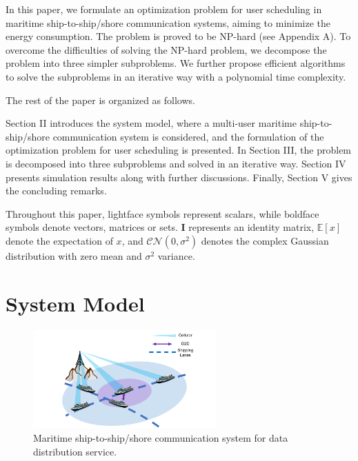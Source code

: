 \documentclass[conference]{IEEEtran}
\begin{document}

In this paper, we formulate an optimization problem for user scheduling in maritime ship-to-ship/shore communication systems, aiming to minimize the energy consumption. %
The problem is proved to be NP-hard (see Appendix A). To overcome the difficulties of solving the NP-hard problem, we decompose the problem into three simpler subproblems. We further propose efficient algorithms to solve the subproblems in an iterative way with a polynomial time complexity.



The rest of the paper is organized as follows.

Section II introduces the system model, where a multi-user maritime ship-to-ship/shore communication system is considered, and the formulation of the optimization problem for user scheduling is presented.
In Section III,  the problem is decomposed into three subproblems and solved in an iterative way.
Section IV presents simulation results along with further discussions.
Finally, Section V gives the concluding remarks.

Throughout this paper, lightface symbols represent scalars, while boldface symbols denote vectors, matrices or sets. ${\mathbf{I}}$ represents an identity matrix, $\mathbb{E}[x]$ denote the expectation of $x$, and $\mathcal{CN}(0, {\sigma}^2)$ denotes the complex Gaussian distribution with zero mean and ${\sigma}^2$ variance. 



\section{System Model}\label{sec:2}



\begin{figure} [htb]
\begin{center}
\includegraphics*[width=7cm]{SysModel.png}
\end{center}
\vspace*{-4mm} 
\caption{Maritime ship-to-ship/shore communication system for data distribution service.}\label{fig:1}
\vspace*{-4mm} 
\end{figure}
\end{document}
